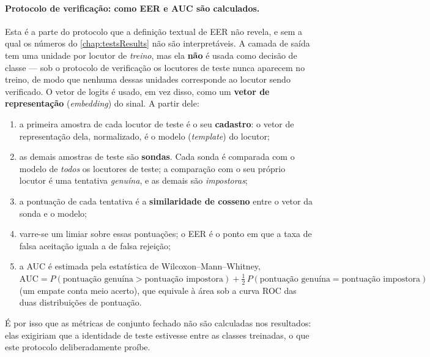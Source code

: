 				\paragraph{Protocolo de verificação: como EER e AUC são calculados.} Esta é a parte do protocolo que a definição textual de \ac{EER} não revela, e sem a qual os números do \autoref{chap:testsResults} não são interpretáveis. A camada de saída tem uma unidade por locutor de \emph{treino}, mas ela \textbf{não} é usada como decisão de classe --- sob o protocolo de verificação os locutores de teste nunca aparecem no treino, de modo que nenhuma dessas unidades corresponde ao locutor sendo verificado. O vetor de logits é usado, em vez disso, como um \textbf{vetor de representação} (\textit{embedding}) do sinal. A partir dele:
				\begin{enumerate}
					\item a primeira amostra de cada locutor de teste é o seu \textbf{cadastro}: o vetor de representação dela, normalizado, é o modelo (\textit{template}) do locutor;
					\item as demais amostras de teste são \textbf{sondas}. Cada sonda é comparada com o modelo de \emph{todos} os locutores de teste; a comparação com o seu próprio locutor é uma tentativa \textit{genuína}, e as demais são \textit{impostoras};
					\item a pontuação de cada tentativa é a \textbf{similaridade de cosseno} entre o vetor da sonda e o modelo;
					\item varre-se um limiar sobre essas pontuações; o \ac{EER} é o ponto em que a taxa de falsa aceitação iguala a de falsa rejeição;
					\item a \ac{AUC} é estimada pela estatística de Wilcoxon--Mann--Whitney, $\text{AUC} = P(\text{pontuação genuína} > \text{pontuação impostora}) + \tfrac{1}{2}\,P(\text{pontuação genuína} = \text{pontuação impostora})$ (um empate conta meio acerto), que equivale à área sob a curva \ac{ROC} das duas distribuições de pontuação.
				\end{enumerate}
				É por isso que as métricas de conjunto fechado não são calculadas nos resultados: elas exigiriam que a identidade de teste estivesse entre as classes treinadas, o que este protocolo deliberadamente proíbe.

